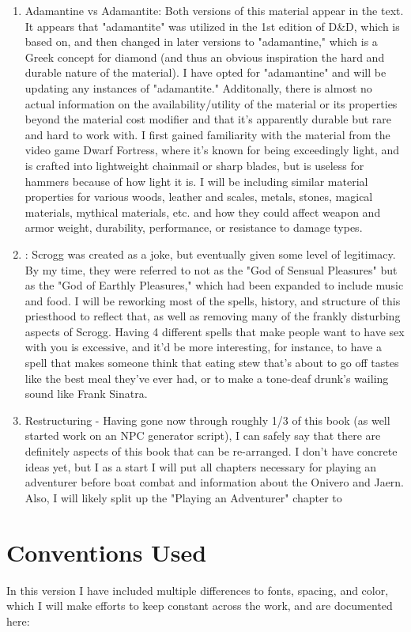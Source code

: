 \begin{enumerate}[leftmargin=12pt]
\item Adamantine vs Adamantite: Both versions of this material appear in the text. It appears that "adamantite" was utilized in the 1st edition of D\&D, which \aq is based on, and then changed in later versions to "adamantine," which is a Greek concept for diamond (and thus an obvious inspiration the hard and durable nature of the material). I have opted for "adamantine" and will be updating any instances of "adamantite." Additonally, there is almost no actual information on the availability/utility of the material or its properties beyond the material cost modifier and that it's apparently durable but rare and hard to work with. I first gained familiarity with the material from the video game Dwarf Fortress, where it's known for being exceedingly light, and is crafted into lightweight chainmail or sharp blades, but is useless for hammers because of how light it is. I will be including similar material properties for various woods, leather and scales, metals, stones, magical materials, mythical materials, etc. and how they could affect weapon and armor weight, durability, performance, or resistance to damage types.
\item {}: Scrogg was created as a joke, but eventually given some level of legitimacy. By my time, they were referred to not as the "God of Sensual Pleasures" but as the "God of Earthly Pleasures," which had been expanded to include music and food. I will be reworking most of the spells, history, and structure of this priesthood to reflect that, as well as removing many of the frankly disturbing aspects of Scrogg. Having 4 different spells that make people want to have sex with you is excessive, and it'd be more interesting, for instance, to have a spell that makes someone think that eating stew that's about to go off tastes like the best meal they've ever had, or to make a tone-deaf drunk's wailing sound like Frank Sinatra. 
\item Restructuring - Having gone now through roughly 1/3 of this book (as well started work on an NPC generator script), I can safely say that there are definitely aspects of this book that can be re-arranged. I don't have concrete ideas yet, but I as a start I will put all chapters necessary for playing an adventurer before boat combat and information about the Onivero and Jaern. Also, I will likely split up the "Playing an Adventurer" chapter to 
\end{enumerate}
\section{Conventions Used}
In this version I have included multiple differences to fonts, spacing, and color, which I will make efforts to keep constant across the work, and are documented here:

